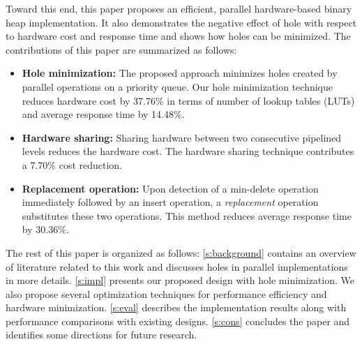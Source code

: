 Toward this end, this paper proposes an efficient, parallel hardware-based binary heap implementation. It also demonstrates the negative effect of hole with respect to hardware cost and response time and shows how holes can be minimized. 
The contributions of this paper are summarized as follows:
\begin{itemize}
\item {\bf Hole minimization:} The proposed approach minimizes holes created by parallel operations on a priority queue. Our hole minimization technique reduces hardware cost by 37.76\% in terms of number of lookup tables (LUTs) and average response time by 14.48\%.
\item {\bf Hardware sharing:} Sharing hardware between two consecutive pipelined levels reduces the hardware cost. The hardware sharing technique contributes a 7.70\% cost reduction.
\item {\bf Replacement operation:} Upon detection of a min-delete operation immediately followed by an insert operation, a {\it replacement} operation substitutes these two operations. This method reduces average response time by 30.36\%.
\end{itemize}

The rest of this paper is organized as follows:
\autoref{s:background} contains an overview of literature related to this work and discusses holes in parallel implementations in more details.
\autoref{s:impl} presents our proposed design with hole minimization. 
We also propose several optimization techniques for performance efficiency and hardware minimization.
\autoref{s:eval} describes the implementation results along with performance comparisons with existing designs.
\autoref{s:cons} concludes the paper and identifies some directions for future research.
